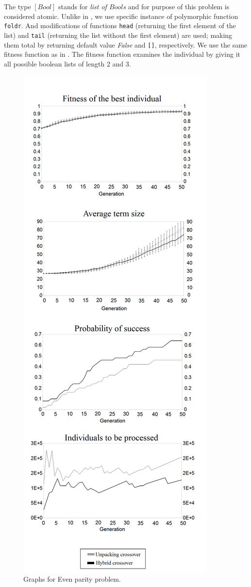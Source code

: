 \documentclass{sig-alternate}
\begin{document}
The type $[Bool]$ stands for \textit{list of $Bool$s} and for purpose of
this problem is considered atomic.
Unlike in \cite{yu01}, we use specific instance of polymorphic 
function \texttt{foldr}. 
And modifications of functions \texttt{head} 
(returning the first element of the list) 
and \texttt{tail} (returning the list without the first element) are used; 
making them total by returning default value \textit{False}
and \texttt{[]}, respectively.
We use the same fitness function as in \cite{yu01}. 
The fitness function examines the individual by giving
it all possible boolean lists of length 2 and 3.

\begin{figure}[h!]
  \centering
  \caption{Graphs for Even parity problem.}
  \includegraphics[scale=0.251]{grafy/EP.PNG}
\end{figure}
\end{document}

